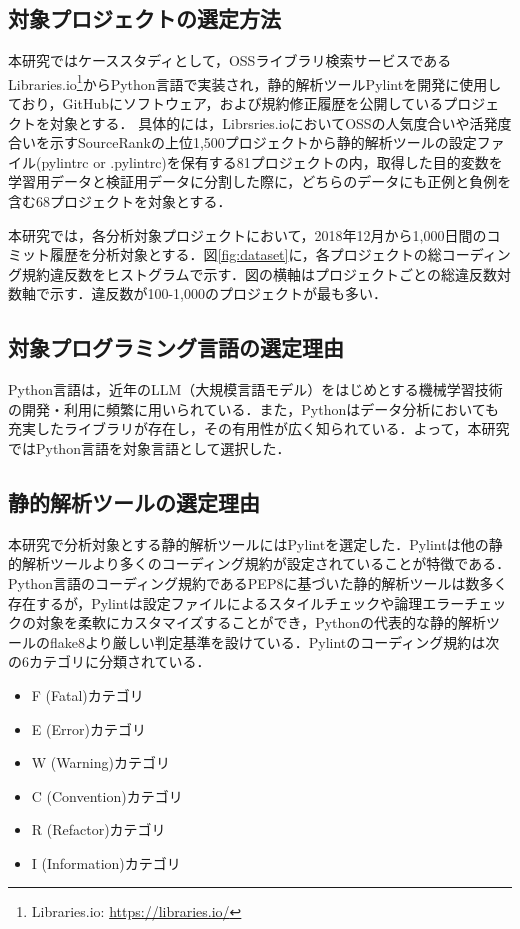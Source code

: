 \documentclass[11pt,dvipdfmx]{jreport}
\begin{document}
\subsection{対象プロジェクトの選定方法}
本研究ではケーススタディとして，OSSライブラリ検索サービスであるLibraries.io\footnote{Libraries.io: \url{https://libraries.io/}}からPython言語で実装され，静的解析ツールPylintを開発に使用しており，GitHubにソフトウェア，および規約修正履歴を公開しているプロジェクトを対象とする．
具体的には，Librsries.ioにおいてOSSの人気度合いや活発度合いを示すSourceRankの上位1,500プロジェクトから静的解析ツールの設定ファイル(pylintrc or .pylintrc)を保有する81プロジェクトの内，取得した目的変数を学習用データと検証用データに分割した際に，どちらのデータにも正例と負例を含む68プロジェクトを対象とする．

本研究では，各分析対象プロジェクトにおいて，2018年12月から1,000日間のコミット履歴を分析対象とする．図\ref{fig:dataset}に，各プロジェクトの総コーディング規約違反数をヒストグラムで示す．図の横軸はプロジェクトごとの総違反数対数軸で示す．違反数が100-1,000のプロジェクトが最も多い．

\subsection{対象プログラミング言語の選定理由}

Python言語は，近年のLLM（大規模言語モデル）をはじめとする機械学習技術の開発・利用に頻繁に用いられている．また，Pythonはデータ分析においても充実したライブラリが存在し，その有用性が広く知られている．よって，本研究ではPython言語を対象言語として選択した．

\subsection{静的解析ツールの選定理由}

本研究で分析対象とする静的解析ツールにはPylintを選定した．Pylintは他の静的解析ツールより多くのコーディング規約が設定されていることが特徴である．Python言語のコーディング規約であるPEP8に基づいた静的解析ツールは数多く存在するが，Pylintは設定ファイルによるスタイルチェックや論理エラーチェックの対象を柔軟にカスタマイズすることができ，Pythonの代表的な静的解析ツールのflake8より厳しい判定基準を設けている．Pylintのコーディング規約は次の6カテゴリに分類されている．

\begin{itemize}
  \item F (Fatal)カテゴリ
  \item E (Error)カテゴリ
  \item W (Warning)カテゴリ
  \item C (Convention)カテゴリ
  \item R (Refactor)カテゴリ
  \item I (Information)カテゴリ
\end{itemize}
\end{document}
